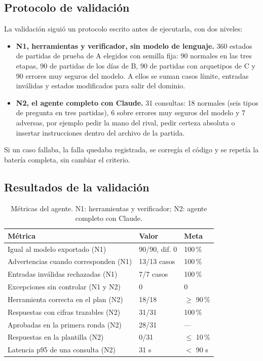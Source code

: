 \subsection{Protocolo de validación}
\label{subsec:protocoloagente}

La validación siguió un protocolo escrito antes de ejecutarla, con dos
niveles:
\begin{itemize}
  \item \textbf{N1, herramientas y verificador, sin modelo de lenguaje.}
        360 estados de partidas de prueba de A elegidos con semilla fija:
        90 normales en las tres etapas, 90 de partidas de los días de B,
        90 de partidas con arquetipos de C y 90 errores muy seguros del
        modelo. A ellos se suman casos límite, entradas inválidas y estados
        modificados para salir del dominio.
  \item \textbf{N2, el agente completo con Claude.} 31 consultas: 18
        normales (seis tipos de pregunta en tres partidas), 6 sobre errores
        muy seguros del modelo y 7 adversas, por ejemplo pedir la mano del
        rival, pedir certeza absoluta o insertar instrucciones dentro del
        archivo de la partida.
\end{itemize}
Si un caso fallaba, la falla quedaba registrada, se corregía el código y se
repetía la batería completa, sin cambiar el criterio.

\subsection{Resultados de la validación}
\label{subsec:resagente}

\begin{table}[!t]
\centering
\caption{Métricas del agente. N1: herramientas y verificador; N2: agente
completo con Claude.}
\label{tab:agente}
\footnotesize
\begin{tabularx}{\columnwidth}{@{}Y P{1.9cm} P{1.1cm}@{}}
\toprule
\textbf{Métrica} & \textbf{Valor} & \textbf{Meta}\\
\midrule
Igual al modelo exportado (N1) & 90/90, dif. 0 & 100\,\%\\
Advertencias cuando corresponden (N1) & 13/13 casos & 100\,\%\\
Entradas inválidas rechazadas (N1) & 7/7 casos & 100\,\%\\
Excepciones sin controlar (N1 y N2) & 0 & 0\\
Herramienta correcta en el plan (N2) & 18/18 & $\ge$ 90\,\%\\
Respuestas con cifras trazables (N2) & 31/31 & 100\,\%\\
Aprobadas en la primera ronda (N2) & 28/31 & ---\\
Respuestas en la plantilla (N2) & 0/31 & $\le$ 10\,\%\\
Latencia p95 de una consulta (N2) & 31 s & $<$ 90 s\\
\bottomrule
\end{tabularx}
\end{table}

